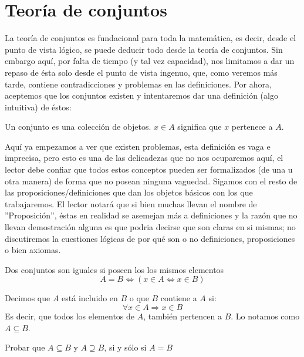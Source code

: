 \documentclass[12pt,a4paper]{book}
\begin{document}
\else
\fi

\section{Teoría de conjuntos}
La teoría de conjuntos es fundacional para toda la matemática, es decir, desde el punto
de vista lógico, se puede deducir todo desde la teoría de conjuntos. Sin embargo aquí,
por falta de tiempo (y tal vez capacidad), nos limitamos a dar un repaso de ésta solo desde el punto de vista
ingenuo, que, como veremos más tarde, contiene contradicciones y problemas en las definiciones. Por ahora, aceptemos que los conjuntos existen y intentaremos dar una definición (algo intuitiva) de éstos: \\

\begin{defi} %
Un conjunto es una colección de objetos. $x \in A$ significa que $x$ pertenece a $A$.
\end{defi}

Aquí ya empezamos a ver que existen problemas, esta definición es vaga e imprecisa, pero esto es una de las delicadezas que no nos ocuparemos aquí, el lector debe confiar que todos estos conceptos pueden ser formalizados (de una u otra manera) de forma que no posean ninguna vaguedad. Sigamos con el resto de las proposiciones/definiciones que dan los objetos básicos con los que trabajaremos. El lector notará que si bien muchas llevan el nombre de ''Proposición'', éstas en realidad se asemejan más a definiciones y la razón que no llevan demostración alguna es que podria decirse que son claras en si mismas; no discutiremos la cuestiones lógicas de por qué son o no definiciones, proposiciones o bien axiomas. \newpage

\begin{prop} %
Dos conjuntos son iguales si poseen los los mismos elementos \\
$$ A = B \Longleftrightarrow (x \in A \Leftrightarrow x\in B ) $$
\end{prop}

\begin{defi} %
Decimos que $A$ está incluido en $B$ o que $B$ contiene a $A$ si:
$$ \forall x \in A \Rightarrow x\in B $$
Es decir, que todos los elementos de $A$, también pertencen a $B$. Lo notamos como $ A \subseteq B $.
\end{defi}

\begin{ej} %
Probar que $A \subseteq B$ y $A \supseteq B$, si y sólo si $A=B$
\end{ej}
\end{document}
